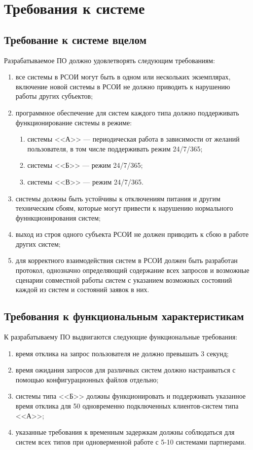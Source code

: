  \section{Требования к системе}
 \subsection{Требование к системе вцелом}

 Разрабатываемое ПО должно удовлетворять следующим требованиям:

 \begin{enumerate}
 	\item все системы в РСОИ могут быть в одном или нескольких экземплярах, включение новой системы в РСОИ не должно приводить к нарушению работы других субъектов;
 	\item программное обеспечение для систем каждого типа должно 	поддерживать функционирование системы в режиме:
 		\begin{enumerate}
 			\item системы <<А>> --- периодическая работа в зависимости от желаний пользователя, в том числе поддерживать режим 24/7/365;
 			\item системы <<Б>> --- режим 24/7/365;
 			\item системы <<В>> --- режим 24/7/365.
 		\end{enumerate}
 	\item системы должны быть устойчивы к отключениям питания и другим техническим сбоям, которые могут привести к нарушению нормального фуннкционирования систем;
 	\item выход из строя одного субъекта РСОИ не должен приводить к сбою в работе других систем;
 	\item для корректного взаимодействия систем в РСОИ должен быть разработан протокол, однозначно определяющий содержание всех запросов и возможные сценарии совместной работы систем с указанием возможных состояний каждой из систем и состояний заявок в них.
 \end{enumerate}

 \subsection{Требования к функциональным характеристикам}
 К разрабатываему ПО выдвигаются следующие функциональные требования:
 \begin{enumerate}
 	\item время отклика на запрос пользователя не должно превышать 3 секунд;
 	\item время ожидания запросов для различных систем должно настраиваться с помощью конфигурационных файлов отдельно;
 	\item системы типа <<Б>> должны функционировать и поддерживать указанное время отклика для 50 одновременно подключенных клиентов-систем типа <<А>>;
 	\item указанные требования к временным задержкам должны соблюдаться для систем всех типов при одноверменной работе с 5-10 системами партнерами.
 \end{enumerate}

